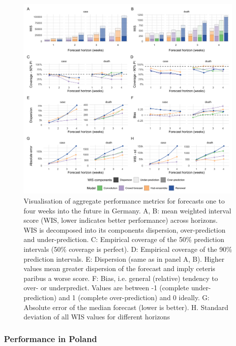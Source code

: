 \documentclass[10pt,letterpaper]{article}
\begin{document}
\begin{figure}[H]
\includegraphics[width=1\linewidth,]{../analysis/plots/aggregate-performance-all-Germany-v4} \caption{Visualisation of aggregate performance metrics for forecasts one to four weeks into the future in Germany. A, B: mean weighted interval score (WIS, lower indicates better performance) across horizons. WIS is decomposed into its components dispersion, over-prediction and under-prediction. C: Empirical coverage of the 50\% prediction intervals (50\% coverage is perfect). D: Empirical coverage of the 90\% prediction intervals. E: Dispersion (same as in panel A, B). Higher values mean greater dispersion of the forecast and imply ceteris paribus a worse score. F: Bias, i.e. general (relative) tendency to over- or underpredict. Values are between -1 (complete under-prediction) and 1 (complete over-prediction) and 0 ideally. G: Absolute error of the median forecast (lower is better). H. Standard deviation of all WIS values for different horizons}\label{fig:agg-performance-all-Germany}
\end{figure}

\hypertarget{performance-in-poland}{%
\subsubsection{Performance in Poland}\label{performance-in-poland}}
\end{document}
